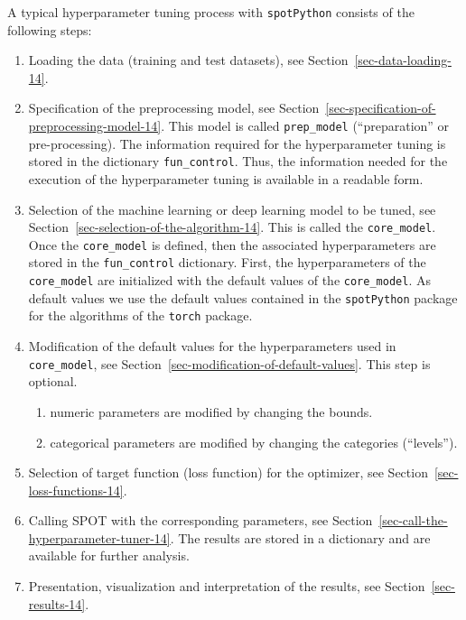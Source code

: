 \documentclass[
  letterpaper,
  DIV=11,
  numbers=noendperiod]{scrreprt}
\providecommand{\tightlist}{%
  \setlength{\itemsep}{0pt}\setlength{\parskip}{0pt}}\usepackage{longtable,booktabs,array}
\begin{document}
A typical hyperparameter tuning process with \texttt{spotPython}
consists of the following steps:

\begin{enumerate}
\def\labelenumi{\arabic{enumi}.}
\tightlist
\item
  Loading the data (training and test datasets), see
  Section~\ref{sec-data-loading-14}.
\item
  Specification of the preprocessing model, see
  Section~\ref{sec-specification-of-preprocessing-model-14}. This model
  is called \texttt{prep\_model} (``preparation'' or pre-processing).
  The information required for the hyperparameter tuning is stored in
  the dictionary \texttt{fun\_control}. Thus, the information needed for
  the execution of the hyperparameter tuning is available in a readable
  form.
\item
  Selection of the machine learning or deep learning model to be tuned,
  see Section~\ref{sec-selection-of-the-algorithm-14}. This is called
  the \texttt{core\_model}. Once the \texttt{core\_model} is defined,
  then the associated hyperparameters are stored in the
  \texttt{fun\_control} dictionary. First, the hyperparameters of the
  \texttt{core\_model} are initialized with the default values of the
  \texttt{core\_model}. As default values we use the default values
  contained in the \texttt{spotPython} package for the algorithms of the
  \texttt{torch} package.
\item
  Modification of the default values for the hyperparameters used in
  \texttt{core\_model}, see
  Section~\ref{sec-modification-of-default-values}. This step is
  optional.

  \begin{enumerate}
  \def\labelenumii{\arabic{enumii}.}
  \tightlist
  \item
    numeric parameters are modified by changing the bounds.
  \item
    categorical parameters are modified by changing the categories
    (``levels'').
  \end{enumerate}
\item
  Selection of target function (loss function) for the optimizer, see
  Section~\ref{sec-loss-functions-14}.
\item
  Calling SPOT with the corresponding parameters, see
  Section~\ref{sec-call-the-hyperparameter-tuner-14}. The results are
  stored in a dictionary and are available for further analysis.
\item
  Presentation, visualization and interpretation of the results, see
  Section~\ref{sec-results-14}.
\end{enumerate}
\end{document}
